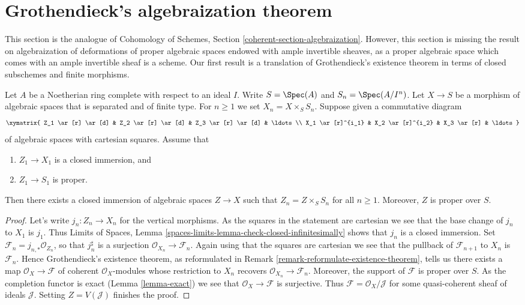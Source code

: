 \section{Grothendieck's algebraization theorem}
\label{section-algebraization}

\noindent
This section is the analogue of
Cohomology of Schemes, Section \ref{coherent-section-algebraization}.
However, this section is missing the result on algebraization of deformations
of proper algebraic spaces endowed with ample invertible sheaves, as a
proper algebraic space which comes with an ample invertible sheaf is
a scheme. Our first result is a translation of Grothendieck's existence
theorem in terms of closed subschemes and finite morphisms.

\begin{lemma}
\label{lemma-algebraize-formal-closed-subscheme}
Let $A$ be a Noetherian ring complete with respect to an ideal $I$.
Write $S = \Spec(A)$ and $S_n = \Spec(A/I^n)$.
Let $X \to S$ be a morphism of algebraic spaces that is separated
and of finite type.
For $n \geq 1$ we set $X_n = X \times_S S_n$.
Suppose given a commutative diagram
$$
\xymatrix{
Z_1 \ar[r] \ar[d] & Z_2 \ar[r] \ar[d] & Z_3 \ar[r] \ar[d] & \ldots \\
X_1 \ar[r]^{i_1} & X_2 \ar[r]^{i_2} & X_3 \ar[r] & \ldots
}
$$
of algebraic spaces with cartesian squares. Assume that
\begin{enumerate}
\item $Z_1 \to X_1$ is a closed immersion, and
\item $Z_1 \to S_1$ is proper.
\end{enumerate}
Then there exists a closed immersion of algebraic spaces $Z \to X$ such that
$Z_n = Z \times_S S_n$ for all $n \geq 1$. Moreover, $Z$ is proper over $S$.
\end{lemma}

\begin{proof}
Let's write $j_n : Z_n \to X_n$ for the vertical morphisms.
As the squares in the statement are cartesian
we see that the base change of $j_n$ to $X_1$ is $j_1$.
Thus Limits of Spaces, Lemma
\ref{spaces-limits-lemma-check-closed-infinitesimally}
shows that $j_n$ is a closed immersion.
Set $\mathcal{F}_n = j_{n, *}\mathcal{O}_{Z_n}$, so that
$j_n^\sharp$ is a surjection $\mathcal{O}_{X_n} \to \mathcal{F}_n$.
Again using that the squares are cartesian we see that
the pullback of $\mathcal{F}_{n + 1}$ to $X_n$ is $\mathcal{F}_n$.
Hence Grothendieck's existence theorem, as reformulated in
Remark \ref{remark-reformulate-existence-theorem},
tells us there exists a map
$\mathcal{O}_X \to \mathcal{F}$
of coherent $\mathcal{O}_X$-modules whose restriction to
$X_n$ recovers $\mathcal{O}_{X_n} \to \mathcal{F}_n$.
Moreover, the support of $\mathcal{F}$ is proper over $S$.
As the completion functor is exact (Lemma \ref{lemma-exact})
we see that $\mathcal{O}_X \to \mathcal{F}$
is surjective. Thus $\mathcal{F} = \mathcal{O}_X/\mathcal{J}$
for some quasi-coherent sheaf of ideals $\mathcal{J}$.
Setting $Z = V(\mathcal{J})$ finishes the proof.
\end{proof}

